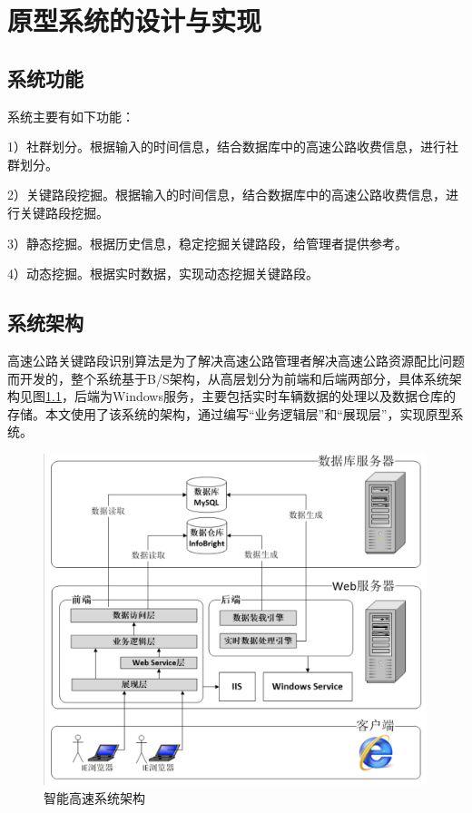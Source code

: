 
\chapter{原型系统的设计与实现}
	\section{系统功能}
		系统主要有如下功能：

		1）社群划分。根据输入的时间信息，结合数据库中的高速公路收费信息，进行社群划分。

		2）关键路段挖掘。根据输入的时间信息，结合数据库中的高速公路收费信息，进行关键路段挖掘。

		3）静态挖掘。根据历史信息，稳定挖掘关键路段，给管理者提供参考。

		4）动态挖掘。根据实时数据，实现动态挖掘关键路段。

	\section{系统架构}
		高速公路关键路段识别算法是为了解决高速公路管理者解决高速公路资源配比问题而开发的，整个系统基于B/S架构，从高层划分为前端和后端两部分，具体系统架构见图\ref{fig20}，后端为Windows服务，主要包括实时车辆数据的处理以及数据仓库的存储。本文使用了该系统的架构，通过编写“业务逻辑层”和“展现层”，实现原型系统。
		\begin{figure}[h]
		\centering
				\begin{minipage}{0.8\linewidth}
					\centering
					\includegraphics[width=4.4in]{picture/jiagou}
					\caption{智能高速系统架构}
					\label{fig20}
				\end{minipage}%
		\end{figure}

